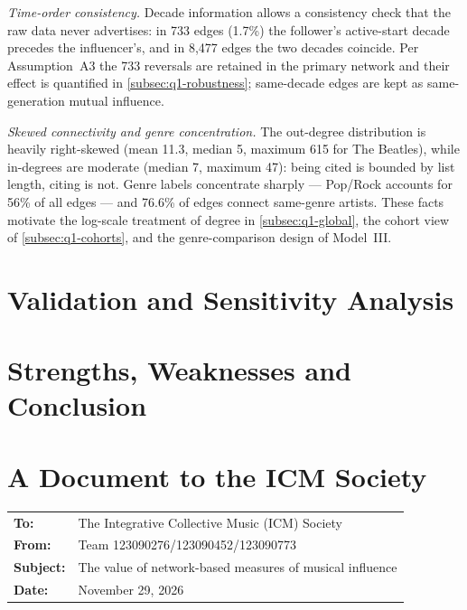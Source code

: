 \documentclass[11pt,letterpaper]{article}
\numberwithin{equation}{section}
\begin{document}
\emph{Time-order consistency.} Decade information allows a consistency
check that the raw data never advertises: in 733 edges (1.7\%) the follower's
active-start decade precedes the influencer's, and in 8{,}477 edges the two
decades coincide. Per Assumption~A3 the 733 reversals are retained in the
primary network and their effect is quantified in
\cref{subsec:q1-robustness}; same-decade edges are kept as same-generation
mutual influence.

\emph{Skewed connectivity and genre concentration.} The out-degree
distribution is heavily right-skewed (mean 11.3, median 5, maximum 615 for
The Beatles), while in-degrees are moderate (median 7, maximum 47): being
cited is bounded by list length, citing is not. Genre labels concentrate
sharply --- Pop/Rock accounts for 56\% of all edges --- and 76.6\% of edges
connect same-genre artists. These facts motivate the log-scale treatment of
degree in \cref{subsec:q1-global}, the cohort view of
\cref{subsec:q1-cohorts}, and the genre-comparison design of Model~III.









\section{Validation and Sensitivity Analysis}\label{sec:validation}

\section{Strengths, Weaknesses and Conclusion}\label{sec:conclusion}

\newpage
\section*{A Document to the ICM Society}
\label{sec:memo}
\noindent\begin{tabular}{@{}ll@{}}
  \textbf{To:}      & The Integrative Collective Music (ICM) Society \\
  \textbf{From:}    & Team 123090276/123090452/123090773 \\
  \textbf{Subject:} & The value of network-based measures of musical influence \\
  \textbf{Date:}    & November 29, 2026 \\
\end{tabular}
\end{document}
